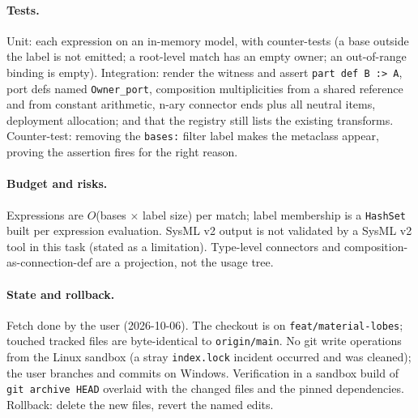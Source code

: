 \documentclass[11pt,a4paper]{article}
\begin{document}
\paragraph{Tests.} Unit: each expression on an in-memory model, with counter-tests
(a base outside the label is not emitted; a root-level match has an empty owner;
an out-of-range binding is empty). Integration: render the witness and assert
\texttt{part def B :> A}, port defs named \texttt{Owner\_port}, composition multiplicities
from a shared reference and from constant arithmetic, n-ary connector ends plus all
neutral items, deployment allocation; and that the registry still lists the
existing transforms. Counter-test: removing the \texttt{bases:} filter label makes the
metaclass appear, proving the assertion fires for the right reason.
\paragraph{Budget and risks.} Expressions are $O$(bases $\times$ label size) per match;
label membership is a \texttt{HashSet} built per expression evaluation. SysML v2 output is not validated
by a SysML v2 tool in this task (stated as a limitation). Type-level connectors and
composition-as-connection-def are a projection, not the usage tree.
\paragraph{State and rollback.} Fetch done by the user (2026-10-06). The checkout is
on \texttt{feat/material-lobes}; touched tracked files are byte-identical to
\texttt{origin/main}. No git write operations from the Linux sandbox (a stray
\texttt{index.lock} incident occurred and was cleaned); the user branches and commits on
Windows. Verification in a sandbox build of \texttt{git archive HEAD} overlaid with the
changed files and the pinned dependencies. Rollback: delete the new files, revert the
named edits.
\begin{center}\end{center}
\end{document}
